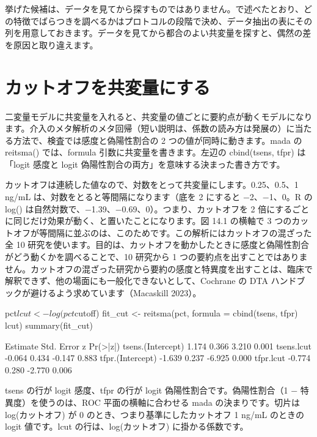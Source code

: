 挙げた候補は、データを見てから探すものではありません。で述べたとおり、どの特徴でばらつきを調べるかはプロトコルの段階で決め、データ抽出の表にその列を用意しておきます。データを見てから都合のよい共変量を探すと、偶然の差を原因と取り違えます。

\section{カットオフを共変量にする}
\label{sec:14-2}

二変量モデルに共変量を入れると、共変量の値ごとに要約点が動くモデルになります。介入のメタ解析のメタ回帰（短い説明は、係数の読み方は発展の）に当たる方法で、検査では感度と偽陽性割合の 2 つの値が同時に動きます。mada の reitsma() では、formula 引数に共変量を書きます。左辺の cbind(tsens, tfpr) は「logit 感度と logit 偽陽性割合の両方」を意味する決まった書き方です。

カットオフは連続した値なので、対数をとって共変量にします。0.25、0.5、1 ng/mL は、対数をとると等間隔になります（底を 2 にすると −2、−1、0。R の log() は自然対数で、−1.39、−0.69、0）。つまり、カットオフを 2 倍にするごとに同じだけ効果が動く、と置いたことになります。図 14.1 の横軸で 3 つのカットオフが等間隔に並ぶのは、このためです。この解析にはカットオフの混ざった全 10 研究を使います。目的は、カットオフを動かしたときに感度と偽陽性割合がどう動くかを調べることで、10 研究から 1 つの要約点を出すことではありません。カットオフの混ざった研究から要約の感度と特異度を出すことは、臨床で解釈できず、他の場面にも一般化できないとして、Cochrane の DTA ハンドブックが避けるよう求めています（Macaskill 2023）。

\begin{rcode}
pct$lcut <- log(pct$cutoff)
fit_cut <- reitsma(pct,
  formula = cbind(tsens, tfpr) ~ lcut)
summary(fit_cut)
\end{rcode}

\begin{rout}
                  Estimate Std. Error      z Pr(>|z|)
tsens.(Intercept)    1.174      0.366  3.210    0.001
tsens.lcut          -0.064      0.434 -0.147    0.883
tfpr.(Intercept)    -1.639      0.237 -6.925    0.000
tfpr.lcut           -0.774      0.280 -2.770    0.006
\end{rout}

tsens の行が logit 感度、tfpr の行が logit 偽陽性割合です。偽陽性割合（1 − 特異度）を使うのは、ROC 平面の横軸に合わせる mada の決まりです。切片は log(カットオフ) が 0 のとき、つまり基準にしたカットオフ 1 ng/mL のときの logit 値です。lcut の行は、log(カットオフ) に掛かる係数です。

